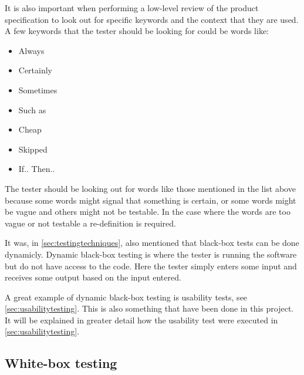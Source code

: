 It is also important when performing a low-level review of the product specification to look out for specific keywords and the context that they are used.
A few keywords that the tester should be looking for could be words like:

\begin{itemize}
	\item Always
	\item Certainly
	\item Sometimes
	\item Such as
	\item Cheap
	\item Skipped
	\item If.. Then..
\end{itemize}

The tester should be looking out for words like those mentioned in the list above because some words might signal that something is certain, or some words might be vague and others might not be testable.
In the case where the words are too vague or not testable a re-definition is required. \cite{SoftwareTesting}

It was, in \cref{sec:testingtechniques}, also mentioned that black-box tests can be done dynamicly.
Dynamic black-box testing is where the tester is running the software but do not have access to the code. %
Here the tester simply enters some input and receives some output based on the input entered. \cite{SoftwareTesting}

A great example of dynamic black-box testing is usability tests, see \cref{sec:usabilitytesting}.
This is also something that have been done in this project.
It will be explained in greater detail how the usability test were executed in \cref{sec:usabilitytesting}. %

\subsection{White-box testing} \label{sec:whiteboxtesting}
